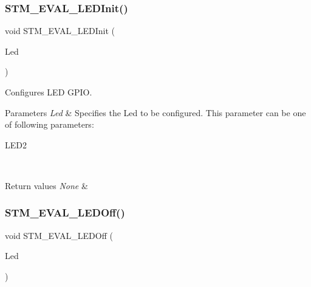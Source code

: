 \subsubsection{\texorpdfstring{STM\_EVAL\_LEDInit()}{STM\_EVAL\_LEDInit()}}
{\footnotesize\ttfamily void S\+T\+M\+\_\+\+E\+V\+A\+L\+\_\+\+L\+E\+D\+Init (\begin{DoxyParamCaption}\item[{\mbox{\hyperlink{group___s_t_m32_f1_x_x___n_u_c_l_e_o___l_o_w___l_e_v_e_l___exported___types_gaa059704b7ca945eb9c1e7f2c3d03fecd}{Led\+\_\+\+Type\+Def}}}]{Led }\end{DoxyParamCaption})}



Configures L\+ED G\+P\+IO. 


\begin{DoxyParams}{Parameters}
{\em Led} & Specifies the Led to be configured. This parameter can be one of following parameters\+: \begin{DoxyItemize}
\item L\+E\+D2 \end{DoxyItemize}
\\
\hline
\end{DoxyParams}

\begin{DoxyRetVals}{Return values}
{\em None} & \\
\hline
\end{DoxyRetVals}
\mbox{\label{group___s_t_m32_f1_x_x___n_u_c_l_e_o___l_o_w___l_e_v_e_l___exported___functions_gab9ab7deafd606e72d72580ec974b7757}} 
\subsubsection{\texorpdfstring{STM\_EVAL\_LEDOff()}{STM\_EVAL\_LEDOff()}}
{\footnotesize\ttfamily void S\+T\+M\+\_\+\+E\+V\+A\+L\+\_\+\+L\+E\+D\+Off (\begin{DoxyParamCaption}\item[{\mbox{\hyperlink{group___s_t_m32_f1_x_x___n_u_c_l_e_o___l_o_w___l_e_v_e_l___exported___types_gaa059704b7ca945eb9c1e7f2c3d03fecd}{Led\+\_\+\+Type\+Def}}}]{Led }\end{DoxyParamCaption})}



